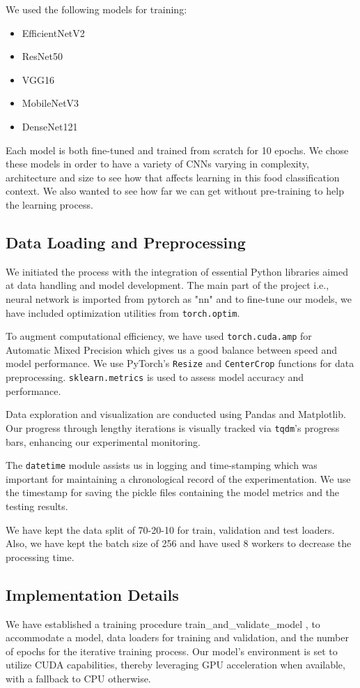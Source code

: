 \documentclass{article}
\begin{document}
We used the following models for training:
\begin{itemize}
    \item EfficientNetV2
    \item ResNet50
    \item VGG16
    \item MobileNetV3
    \item DenseNet121
\end{itemize}

Each model is both fine-tuned and trained from scratch for 10 epochs. We chose these models in order to have a variety of CNNs varying in complexity, architecture and size to see how that affects learning in this food classification context. We also wanted to see how far we can get without pre-training to help the learning process.

\subsection{Data Loading and Preprocessing}

We initiated the process with the integration of essential Python libraries aimed at data handling and model development. The main part of the project i.e., neural network is imported from pytorch as "nn" and to fine-tune our models, we have included optimization utilities from \verb|torch.optim|.

To augment computational efficiency, we have used \verb|torch.cuda.amp| for Automatic Mixed Precision which gives us a good balance between speed and model performance. We use PyTorch's \verb|Resize| and \verb|CenterCrop| functions for data preprocessing. \verb|sklearn.metrics| is used to assess model accuracy and performance. 

Data exploration and visualization are conducted using Pandas and Matplotlib. Our progress through lengthy iterations is visually tracked via \verb|tqdm|'s progress bars, enhancing our experimental monitoring.

The \verb|datetime| module assists us in logging and time-stamping which was important for maintaining a chronological record of the experimentation. We use the timestamp for saving the pickle files containing the model metrics and the testing results.

We have kept the data split of 70-20-10 for train, validation and test loaders. Also, we have kept the batch size of 256 and have used 8 workers to decrease the processing time.

\subsection{Implementation Details}
We have established a training procedure  train\_and\_validate\_model , to accommodate a model, data loaders for training and validation, and the number of epochs for the iterative training process. Our model's environment is set to utilize CUDA capabilities, thereby leveraging GPU acceleration when available, with a fallback to CPU otherwise.
\end{document}
